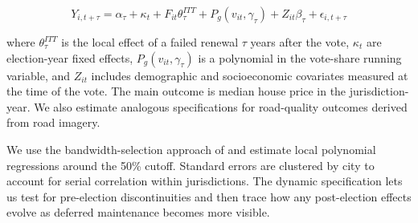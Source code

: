 \begin{equation}
Y_{i,t+\tau} = \alpha_\tau + \kappa_t + F_{it} \theta_{\tau}^{ITT} + P_g (v_{it}, \gamma_\tau) + Z_{it} \beta_\tau + \epsilon_{i,t + \tau}
\label{eq:itt_estimator}
\end{equation}

\noindent where $\theta_{\tau}^{ITT}$ is the local effect of a failed renewal $\tau$ years after the vote, $\kappa_t$ are election-year fixed effects, $P_g (v_{it}, \gamma_\tau)$ is a polynomial in the vote-share running variable, and $Z_{it}$ includes demographic and socioeconomic covariates measured at the time of the vote. The main outcome is median house price in the jurisdiction-year. We also estimate analogous specifications for road-quality outcomes derived from road imagery.

We use the bandwidth-selection approach of \cite{calonico2019regression} and estimate local polynomial regressions around the 50\% cutoff. Standard errors are clustered by city to account for serial correlation within jurisdictions. The dynamic specification lets us test for pre-election discontinuities and then trace how any post-election effects evolve as deferred maintenance becomes more visible.



